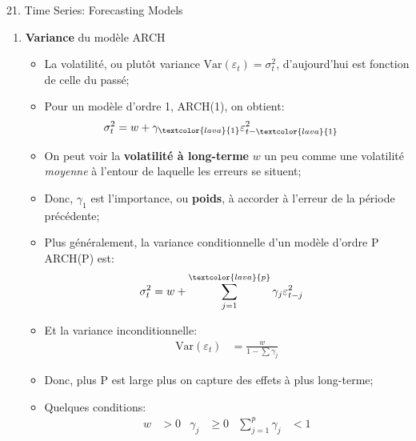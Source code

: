 \documentclass[12pt, titlepage, french]{report}
\begin{document}
\begin{CHPT_SUMM}[label = {timeseries21}]{21. Time Series: Forecasting Models}
\begin{enumerate}
\begin{itemize}
		\item[] Annuellement, il y a une période de temps pour laquelle les résidus sont très volatiles, mais que pour le reste de l'année elle est relativement stable;
		\item	C'est-à-dire, la volatilité est \textbf{conditionnelle} à le moment dans le temps où nous sommes;
		\item[]	L'erreur à un moment dépend de l'erreur au moment précédent et donc nous avons un  modèle \textbf{auto-régressif};
		\end{itemize}
	\item[]	\textbf{Variance} du modèle ARCH
		\begin{itemize}
		\item	La volatilité, ou plutôt variance $\text{Var}(\varepsilon_{t}) = \sigma^{2}_{t}$, d'aujourd'hui est fonction de celle du passé;
		\item	Pour un modèle d'ordre \textcolor{lava}{1}, ARCH(\textcolor{lava}{1}), on obtient:
			\begin{align*}
			\sigma^{2}_{t}	&=	w + \gamma_{\textcolor{lava}{1}} \varepsilon_{t - \textcolor{lava}{1}}^{2}
			\end{align*}
		\item[]	On peut voir la \textbf{volatilité à long-terme} $w$ un peu comme une volatilité \og \textit{moyenne} \fg{} à l'entour de laquelle les erreurs se situent;
		\item[]	Donc, $\gamma_{1}$ est l'importance, ou \textbf{poids}, à accorder à l'erreur de la période précédente;
		\item	Plus généralement, la variance conditionnelle d'un modèle d'ordre \textcolor{lava}{P} AR\textcolor{lava}{CH}(\textcolor{lava}{P}) est:
			\begin{align*}
			\sigma^{2}_{t}	&=	w + \sum_{j = 1}^{\textcolor{lava}{p}} \gamma_{j} \varepsilon_{t - j}^{2}
			\end{align*}
		\item	Et la variance inconditionnelle: 
			\begin{align*}
			\text{Var}(\varepsilon_{t})	
			&=	\frac{w}{1 - \sum \gamma_{j}}
			\end{align*}
		\item	Donc, plus P est large plus on capture des effets à plus long-terme;
		\item	Quelques conditions:
			\begin{align*}
			w &> 0	&	
			\gamma_{j} &\ge 0	&
			\sum_{j = 1}^{p} \gamma_{j} &< 1
			\end{align*}

\end{itemize}
\end{enumerate}
\end{CHPT_SUMM}
\end{document}
